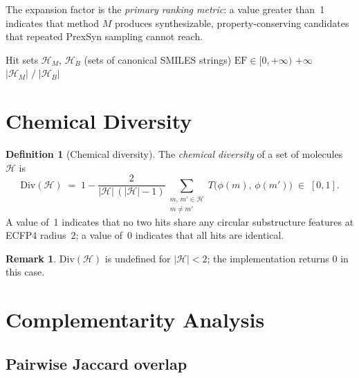 \documentclass[11pt, a4paper]{article}
\theoremstyle{definition}
\newtheorem{definition}{Definition}[section]
\newtheorem{remark}{Remark}[section]
\newcommand{\1}[1]{\mathbf{1}\!\left[#1\right]}   %
\newcommand{\Hit}{\mathcal{H}}                      %
\newcommand{\fp}[1]{\phi(#1)}                       %
\begin{document}
The expansion factor is the \emph{primary ranking metric}: a value greater
than~1 indicates that method $M$ produces synthesizable, property-conserving
candidates that repeated PrexSyn sampling cannot reach.

\begin{algorithm}[H]
\caption{\textsc{ExpansionFactor}$(\Hit_M, \Hit_B)$}
\label{alg:expansion}
\begin{algorithmic}[1]
\Require Hit sets $\Hit_M$, $\Hit_B$ (sets of canonical SMILES strings)
\Ensure  $\text{EF} \in [0, +\infty)$
\If{$|\Hit_B| = 0$} \Return $+\infty$ \EndIf
\Return $|\Hit_M| \;/\; |\Hit_B|$
\end{algorithmic}
\end{algorithm}


\section{Chemical Diversity}
\label{sec:diversity}

\begin{definition}[Chemical diversity]
\label{def:diversity}
The \emph{chemical diversity} of a set of molecules $\mathcal{H}$ is
\[
  \text{Div}(\mathcal{H})
  \;=\; 1 - \frac{2}{|\mathcal{H}|\,(|\mathcal{H}|-1)}
            \sum_{\substack{m,\, m' \in \mathcal{H} \\ m \neq m'}}
            T\!\bigl(\fp{m},\, \fp{m'}\bigr)
  \;\in\; [0, 1].
\]
A value of~1 indicates that no two hits share any circular substructure
features at ECFP4 radius~2; a value of~0 indicates that all hits are
identical.
\end{definition}

\begin{remark}
$\text{Div}(\mathcal{H})$ is undefined for $|\mathcal{H}| < 2$;
the implementation returns 0 in this case.
\end{remark}


\section{Complementarity Analysis}
\label{sec:complementarity}

\subsection{Pairwise Jaccard overlap}
\end{document}

